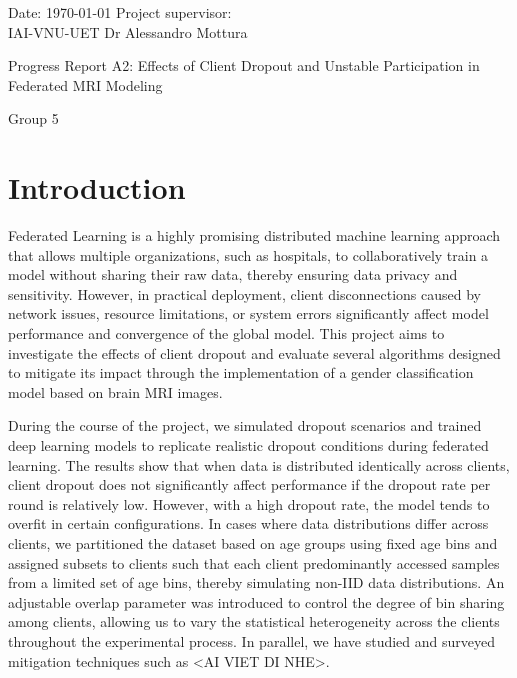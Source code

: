 \documentclass[12pt, a4paper]{article}
\begin{document}
\onehalfspacing


Date: \today{}     \hfill{} Project supervisor: \\
IAI-VNU-UET   \hfill{} Dr Alessandro Mottura

{\LARGE Progress Report A2: Effects of Client Dropout and Unstable Participation in Federated MRI Modeling}

{\Large  Group 5}

\vspace{0.4in}


\singlespacing
\tableofcontents



\onehalfspacing


\section{Introduction}
Federated Learning is a highly promising distributed machine learning approach that allows multiple organizations, such as hospitals, to collaboratively train a model without sharing their raw data, thereby ensuring data privacy and sensitivity. However, in practical deployment, client disconnections caused by network issues, resource limitations, or system errors significantly affect model performance and convergence of the global model. This project aims to investigate the effects of client dropout and evaluate several algorithms designed to mitigate its impact through the implementation of a gender classification model based on brain MRI images.

During the course of the project, we simulated dropout scenarios and trained deep learning models to replicate realistic dropout conditions during federated learning. The results show that when data is distributed identically across clients, client dropout does not significantly affect performance if the dropout rate per round is relatively low. However, with a high dropout rate, the model tends to overfit in certain configurations. In cases where data distributions differ across clients, we partitioned the dataset based on age groups using fixed age bins and assigned subsets to clients such that each client predominantly accessed samples from a limited set of age bins, thereby simulating non-IID data distributions. An adjustable overlap parameter was introduced to control the degree of bin sharing among clients, allowing us to vary the statistical heterogeneity across the clients throughout the experimental process. In parallel, we have studied and surveyed mitigation techniques such as <AI VIET DI NHE>.
\end{document}
